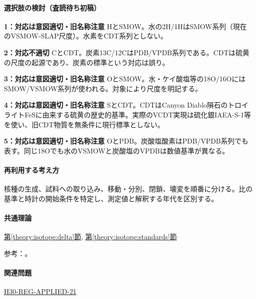 \paragraph{選択肢の検討（査読待ち初稿）}\mbox{}\par

\noindent\textbf{1：対応は意図適切・旧名称注意} HとSMOW。水の2H/1HはSMOW系列（現在のVSMOW-SLAP尺度）。水素をCDT系列としない。\par

\noindent\textbf{2：対応不適切} CとCDT。炭素13C/12CはPDB/VPDB系列である。CDTは硫黄の尺度の起源であり、炭素の標準という対応は誤り。\par

\noindent\textbf{3：対応は意図適切・旧名称注意} OとSMOW。水・ケイ酸塩等の18O/16OにはSMOW/VSMOW系列が使われる。対象により尺度を明記する。\par

\noindent\textbf{4：対応は意図適切・旧名称注意} SとCDT。CDTはCanyon Diablo隕石のトロイライトFeSに由来する硫黄の歴史的基準。実際のVCDT実現は硫化銀IAEA-S-1等を使い、旧CDT物質を無条件に現行標準としない。\par

\noindent\textbf{5：対応は意図適切・旧名称注意} OとPDB。炭酸塩酸素はPDB/VPDB系列でも表す。同じ18Oでも水のVSMOWと炭酸塩のVPDBは数値基準が異なる。\par

\paragraph{再利用する考え方} 核種の生成、試料への取り込み、移動・分別、閉鎖、壊変を順番に分ける。比の基準と時計の開始条件を特定し、測定値と解釈する年代を区別する。

\paragraph{共通理論} \hyperref[theory:isotope:delta]{第\ref*{theory:isotope:delta}節}, \hyperref[theory:isotope:standards]{第\ref*{theory:isotope:standards}節}

\par 参考：\cite{iso_standards1995,iso_vsmow2,iso_vcdt}。

\paragraph{関連問題} \hyperref[q:h30-reg-applied-21]{H30-REG-APPLIED-21}


